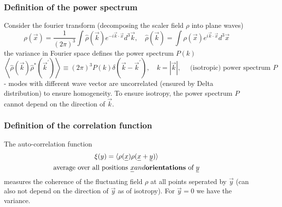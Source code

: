 \subsubsection{Definition of the power spectrum}
Consider the fourier transform (decomposing the scaler field $\rho$ into plane waves)
\begin{equation}
    \rho(\vec{x})=\frac{1}{(2 \pi)^3} \int \hat{\rho}(\vec{k}) e^{-i \vec{k} \cdot \vec{x}} d^3 \vec{k}, \quad \hat{\rho}(\vec{k})=\int \rho(\vec{x}) e^{i \vec{k} \cdot \vec{x}} d^3 \vec{x}
\end{equation}
the variance in Fourier space defines the power spectrum $P(k)$
\begin{equation}
    \label{eq:powerspectrum}
    \left\langle\hat{\rho}(\vec{k}) \hat{\rho}^*\left(\vec{k}^{\prime}\right)\right\rangle \equiv(2 \pi)^3 P(k) \delta\left(\vec{k}-\vec{k}^{\prime}\right), \quad k=|\vec{k}|, \quad \text { (isotropic) power spectrum } P
\end{equation}
- modes with different wave vector are uncorrelated (ensured by Delta distribution) to ensure homogeneity. To ensure
isotropy, the power spectrum $P$ cannot depend on the direction of $\vec{k}$.


\subsubsection{Definition of the correlation function}
The auto-correlation function
\begin{equation}
    \begin{gathered}
        \xi(y)=\langle\rho(\vec{x}) \rho(\vec{x}+\vec{y})\rangle \\
        \text{average over all positions } \vec{x} and \text{\textbf{orientations} of } \vec{y}
    \end{gathered}
\end{equation}
measures the coherence of the fluctuating field $\rho$ at all
points seperated by $\vec{y}$ (can also not depend on the
direction of $\vec{y}$ as of isotropy). For $\vec{y} = 0$ we have the variance.

